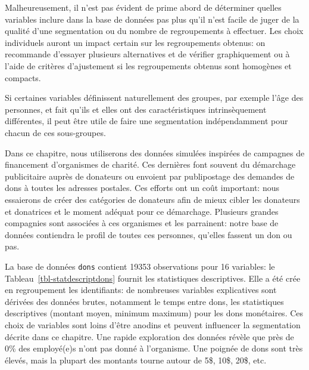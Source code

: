 \documentclass[
  11pt,
  letterpaper,
]{scrbook}
\theoremstyle{definition}
\theoremstyle{remark}
\begin{document}
Malheureusement, il n'est pas évident de prime abord de déterminer
quelles variables inclure dans la base de données pas plus qu'il n'est
facile de juger de la qualité d'une segmentation ou du nombre de
regroupements à effectuer. Les choix individuels auront un impact
certain sur les regroupements obtenus: on recommande d'essayer plusieurs
alternatives et de vérifier graphiquement ou à l'aide de critères
d'ajustement si les regroupements obtenus sont homogènes et compacts.

Si certaines variables définissent naturellement des groupes, par
exemple l'âge des personnes, et fait qu'ils et elles ont des
caractéristiques intrinsèquement différentes, il peut être utile de
faire une segmentation indépendamment pour chacun de ces sous-groupes.

Dans ce chapitre, nous utiliserons des données simulées inspirées de
campagnes de financement d'organismes de charité. Ces dernières font
souvent du démarchage publicitaire auprès de donateurs ou envoient par
publipostage des demandes de dons à toutes les adresses postales. Ces
efforts ont un coût important: nous essaierons de créer des catégories
de donateurs afin de mieux cibler les donateurs et donatrices et le
moment adéquat pour ce démarchage. Plusieurs grandes compagnies sont
associées à ces organismes et les parrainent: notre base de données
contiendra le profil de toutes ces personnes, qu'elles fassent un don ou
pas.

La base de données \texttt{dons} contient 19353 observations pour 16
variables: le Tableau~\ref{tbl-statdescriptdons} fournit les
statistiques descriptives. Elle a été crée en regroupement les
identifiants: de nombreuses variables explicatives sont dérivées des
données brutes, notamment le temps entre dons, les statistiques
descriptives (montant moyen, minimum maximum) pour les dons monétaires.
Ces choix de variables sont loins d'être anodins et peuvent influencer
la segmentation décrite dans ce chapitre. Une rapide exploration des
données révèle que près de 0\% des employé(e)s n'ont pas donné à
l'organisme. Une poignée de dons sont très élevés, mais la plupart des
montants tourne autour de 5\$, 10\$, 20\$, etc.
\end{document}
